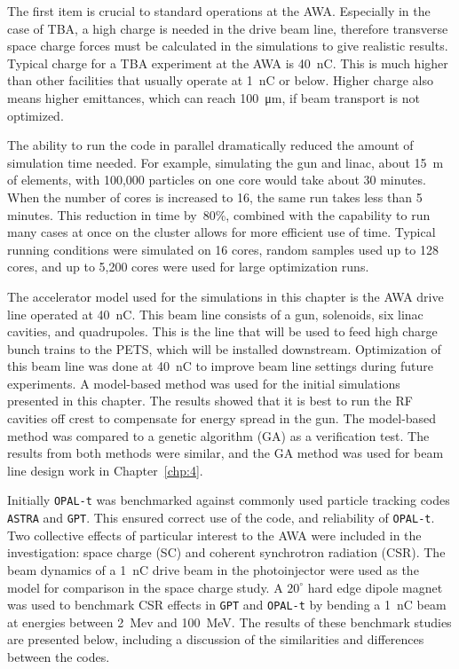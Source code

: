 The first item is crucial to standard operations at the AWA. Especially in the 
case of TBA, a high charge is needed in the drive beam line, therefore transverse 
space charge forces must be calculated in the simulations to give realistic results.
Typical charge for a TBA experiment at the AWA is \SI{40}{nC}. 
This is much higher than other facilities that usually operate at \SI{1}{nC} or below. 
Higher charge also means higher emittances, which can reach \SI{100}{\micro\meter}, 
if beam transport is not optimized.

The ability to run the code in parallel dramatically reduced the amount of simulation time needed. 
For example, simulating the gun and linac, about \SI{15}{m} of elements,
with 100,000 particles on one core would take about 30 minutes. 
When the number of cores is increased to 16, the same run takes less than 
5 minutes. This reduction in time by~80\%, combined with the capability to run 
many cases at once on the cluster allows for more efficient use of time.
Typical running conditions were simulated on 16 cores, random samples used up to 128 cores, 
and up to 5,200 cores were used for large optimization runs.

The accelerator model used for the simulations in this chapter is the AWA drive line operated at \SI{40}{nC}. 
This beam line consists of a gun, solenoids, six linac cavities, and quadrupoles.
This is the line that will be used to feed high charge bunch trains to the PETS, 
which will be installed downstream. Optimization of this beam line was done at \SI{40}{nC}
to improve beam line settings during future experiments.
A model-based method was used for the initial simulations presented in this chapter. The results showed that 
it is best to run the RF cavities off crest to compensate for energy spread in the gun. 
The model-based method was compared to a genetic algorithm (GA) as a verification test.
The results from both methods were similar, and the GA method was used for beam line design work in Chapter~\ref{chp:4}.

\label{sec:bench}

Initially \verb|OPAL-t| was benchmarked against commonly used particle tracking codes \verb|ASTRA| and \verb|GPT|.  
This ensured correct use of the code, and reliability of \verb|OPAL-t|.  
Two collective effects of particular interest to the AWA were included in the investigation: 
space charge (SC) and coherent synchrotron radiation (CSR).
The beam dynamics of a \SI{1}{nC} drive beam in the photoinjector were used as 
the model for comparison in the space charge study. 
A $20^{\circ}$ hard edge dipole magnet was used to benchmark CSR effects in 
\verb|GPT| and \verb|OPAL-t| by bending a \SI{1}{nC} beam 
at energies between \SI{2}{Mev} and \SI{100}{MeV}.  
The results of these benchmark studies are presented below, 
including a discussion of the similarities and differences between the codes.
 
